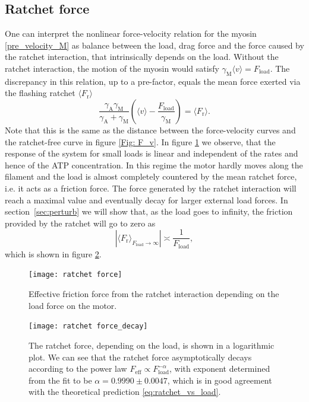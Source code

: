 \documentclass[aps,pre,twocolumn,showpacs,showkeys]{revtex4-1}
\begin{document}
\subsection{Ratchet force} 
One can interpret the nonlinear force-velocity relation for the myosin \eqref{pre_velocity_M} as balance between the load, drag force and the force caused by the ratchet interaction, 
that intrinsically depends on the load. 
Without the ratchet interaction, the motion of the myosin would satisfy $ \gamma_\text{M}\langle v\rangle = F_\text{load}$. 
The discrepancy in this relation, up to a pre-factor, equals the mean force exerted via the flashing ratchet $\langle F_\text{r}\rangle$ 
\begin{equation*}
\frac{\gamma_\text{A}\gamma_\text{M}}{\gamma_\text{A} + \gamma_\text{M} } \left(\langle v \rangle - \frac{F_\text{load}}{\gamma_\text{M}}\right) = \langle F_\text{r} \rangle.
\end{equation*}
Note that this is the same as the distance between the force-velocity curves and the ratchet-free curve in figure \ref{Fig: F_v}.
In figure \ref{Fig: ratchet_force} we observe, 
that the response of the system for small loads is linear and independent of the rates and hence of the ATP concentration. 
In this regime the motor hardly moves along the filament and the load is almost completely countered by the mean ratchet force, i.e. it acts as a friction force.
The force generated by the ratchet interaction will reach a maximal value and eventually decay for larger external load forces. 
In section~\ref{sec:perturb} we will show that, as the load goes to infinity, the friction provided by the ratchet will go to zero as 
\begin{equation}
\left| \langle F_\text{r} \rangle_{F_\text{load}\rightarrow\infty} \right| \asymp \frac{1}{F_\text{load}} , 
\label{eq:retchet_vs_load}
\end{equation} 
which is shown in figure \ref{Fig: ratchet_force_decay}. 
\begin{figure}[t]
\centering
\texttt{[image: ratchet force]}
\caption{Effective friction force from the ratchet interaction depending on the load force on the motor.}
\label{Fig: ratchet_force}
\end{figure}
\begin{figure}[t]
\centering
\texttt{[image: ratchet force\_decay]}
\caption{The ratchet force, depending on the load, is shown in a logarithmic plot. 
We can see that the ratchet force asymptotically decays according to the power law $F_\text{eff} \propto F_\text{load}^{-\alpha}$, 
with exponent determined from the fit to be $\alpha = 0.9990 \pm 0.0047$, 
which is in good agreement with the theoretical prediction \eqref{eq:ratchet_vs_load}.
}
\label{Fig: ratchet_force_decay}
\end{figure}
\end{document}
